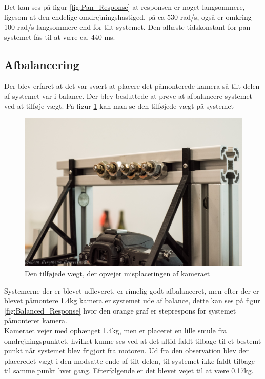 Det kan ses på figur \ref{fig:Pan_Response} at responsen er noget langsommere, ligesom at den endelige omdrejningshastiged, på ca 530 rad/s, også er omkring 100 rad/s langsommere end for tilt-systemet. Den aflæste tidskonstant for pan-systemet fås til at være ca. 440 ms.

\subsection{Afbalancering}

Der blev erfaret at det var svært at placere det påmonterede kamera så tilt delen af systemet var i balance. Der blev besluttede at prøve at afbalancere systemet ved at tilføje vægt. På figur \ref{fig:Afbalancering} kan man se den tilføjede vægt på systemet

\begin{figure}[!hb]
	\begin{center}
		\includegraphics[scale=0.1]{Billeder/Afbalancering.jpg}
		\caption{Den tilføjede vægt, der opvejer misplaceringen af kameraet}
		\label{fig:Afbalancering}
	\end{center}
\end{figure}

Systemerne der er blevet udleveret, er rimelig godt afbalanceret, men efter der er blevet påmontere 1.4kg kamera er systemet ude af balance, dette kan ses på figur \ref{fig:Balanced_Response} hvor den orange graf er steprespons for systemet påmonteret kamera.\\

Kameraet vejer med ophænget 1.4kg, men er placeret en lille smule fra omdrejningspunktet, hvilket kunne ses ved at det altid faldt tilbage til et bestemt punkt når systemet blev frigjort fra motoren.
Ud fra den observation blev der placeredet vægt i den modsatte ende af tilt delen, til systemet ikke faldt tilbage til samme punkt hver gang. Efterfølgende er det blevet vejet til at være 0.17kg.

